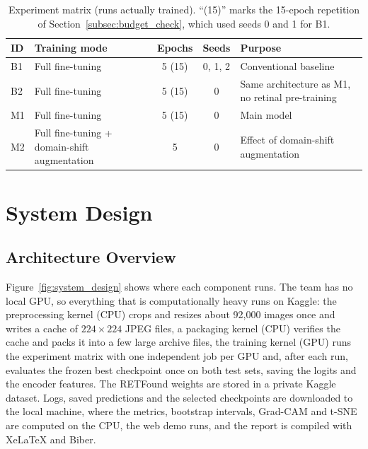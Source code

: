 \begin{table}[htbp]
    \centering
    \caption{Experiment matrix (runs actually trained). ``(15)'' marks the 15-epoch repetition of Section~\ref{subsec:budget_check}, which used seeds 0 and 1 for B1.}
    \label{tab:experiments}
    \begin{tabularx}{\textwidth}{l p{4.6cm} c c X}
        \toprule
        \textbf{ID} & \textbf{Training mode} & \textbf{Epochs} & \textbf{Seeds} & \textbf{Purpose} \\
        \midrule
        B1 & Full fine-tuning & 5 (15) & 0, 1, 2 & Conventional baseline \\
        B2 & Full fine-tuning & 5 (15) & 0 & Same architecture as M1, no retinal pre-training \\
        M1 & Full fine-tuning & 5 (15) & 0 & Main model \\
        M2 & Full fine-tuning + domain-shift augmentation & 5 & 0 & Effect of domain-shift augmentation \\
        \bottomrule
    \end{tabularx}
\end{table}

\section{System Design}
\label{sec:system_design}

\subsection{Architecture Overview}
\label{subsec:architecture}

Figure~\ref{fig:system_design} shows where each component runs. The team has no local GPU, so everything that is computationally heavy runs on Kaggle: the preprocessing kernel (CPU) crops and resizes about 92{,}000 images once and writes a cache of $224\times224$ JPEG files, a packaging kernel (CPU) verifies the cache and packs it into a few large archive files, the training kernel (GPU) runs the experiment matrix with one independent job per GPU and, after each run, evaluates the frozen best checkpoint once on both test sets, saving the logits and the encoder features. The RETFound weights are stored in a private Kaggle dataset. Logs, saved predictions and the selected checkpoints are downloaded to the local machine, where the metrics, bootstrap intervals, Grad-CAM and t-SNE are computed on the CPU, the web demo runs, and the report is compiled with XeLaTeX and Biber.

